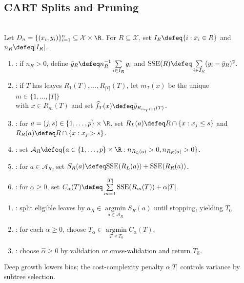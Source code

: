 \subsection{CART Splits and Pruning}
\begin{definition} \label{def:sl-cart-regression-tree-scores} \\
Let $D_n=\{(x_i,y_i)\}_{i=1}^n\subseteq\mathcal{X}\times\R$. For $R\subseteq\mathcal{X}$, set $I_R\defeq\{i:x_i\in R\}$ and $n_R\defeq |I_R|$.
\begin{enumerate}[label=(\roman*)]
\setlength{\itemsep}{0pt}
\item {}: if $n_R>0$, define $\bar y_R\defeq n_R^{-1}\sum\limits_{i\in I_R}y_i$ and $\mathrm{SSE}(R)\defeq\sum\limits_{i\in I_R}(y_i-\bar y_R)^2$.
\item {}: if $T$ has leaves $R_1(T),\ldots,R_{|T|}(T)$, let $m_T(x)$ be the unique $m\in\{1,\ldots,|T|\}$\\
with $x\in R_m(T)$ and set $\widehat{f}_T(x)\defeq\bar y_{R_{m_T(x)}(T)}$.
\item {}: for $a=(j,s)\in\{1,\ldots,p\}\times\R$, set $R_L(a)\defeq R\cap\{x:x_j\leq s\}$ and $R_R(a)\defeq R\cap\{x:x_j>s\}$.
\item {}: set $\mathcal{A}_R\defeq\{a\in\{1,\ldots,p\}\times\R:n_{R_L(a)}>0,n_{R_R(a)}>0\}$.
\item {}: for $a\in\mathcal{A}_R$, set $S_R(a)\defeq\mathrm{SSE}(R_L(a))+\mathrm{SSE}(R_R(a))$.
\item {}: for $\alpha\geq0$, set $C_\alpha(T)\defeq\sum\limits_{m=1}^{|T|}\mathrm{SSE}(R_m(T))+\alpha|T|$.
\end{enumerate}
\end{definition}

\begin{method} \label{meth:sl-cart-tree-growing-and-pruning} 
\begin{enumerate}[label=(\roman*)]
\setlength{\itemsep}{0pt}
\item {}: split eligible leaves by $a_R\in\operatorname*{argmin}\limits_{a\in\mathcal{A}_R}S_R(a)$ until stopping, yielding $T_0$.
\item {}: for each $\alpha\geq0$, choose $T_\alpha\in\operatorname*{argmin}\limits_{T\preceq T_0}C_\alpha(T)$.
\item {}: choose $\widehat{\alpha}\geq0$ by validation or cross-validation and return $T_{\widehat{\alpha}}$.
\end{enumerate}
Deep growth lowers bias; the cost-complexity penalty $\alpha|T|$ controls variance by subtree selection.
\end{method}

